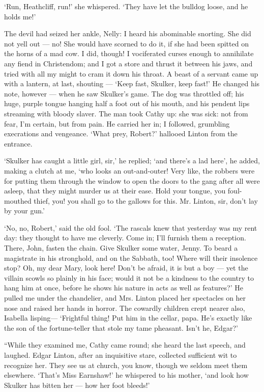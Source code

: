 \par ‘Run, Heathcliff, run!’ she whispered. ‘They have let the bulldog loose, and he holds me!’
\par The devil had seized her ankle, Nelly: I heard his abominable snorting. She did not yell out — no! She would have scorned to do it, if she had been spitted on the horns of a mad cow. I did, though! I vociferated curses enough to annihilate any fiend in Christendom; and I got a store and thrust it between his jaws, and tried with all my might to cram it down his throat. A beast of a servant came up with a lantern, at last, shouting — ‘Keep fast, Skulker, keep fast!’ He changed his note, however — when he saw Skulker's game. The dog was throttled off; his huge, purple tongue hanging half a foot out of his mouth, and his pendent lips streaming with bloody slaver. The man took Cathy up: she was sick: not from fear, I'm certain, but from pain. He carried her in; I followed, grumbling execrations and vengeance. ‘What prey, Robert?’ hallooed Linton from the entrance.
\par ‘Skulker has caught a little girl, sir,’ he replied; ‘and there's a lad here', he added, making a clutch at me, ‘who looks an out-and-outer! Very like, the robbers were for putting them through the window to open the doors to the gang after all were asleep, that they might murder us at their ease. Hold your tongue, you foul-mouthed thief, you! you shall go to the gallows for this. Mr. Linton, sir, don't lay by your gun.’
\par ‘No, no, Robert,’ said the old fool. ‘The rascals knew that yesterday was my rent day: they thought to have me cleverly. Come in; I'll furnish them a reception. There, John, fasten the chain. Give Skulker some water, Jenny. To beard a magistrate in his stronghold, and on the Sabbath, too! Where will their insolence stop? Oh, my dear Mary, look here! Don't be afraid, it is but a boy — yet the villain scowls so plainly in his face; would it not be a kindness to the country to hang him at once, before he shows his nature in acts as well as features?’ He pulled me under the chandelier, and Mrs. Linton placed her spectacles on her nose and raised her hands in horror. The cowardly children crept nearer also, Isabella lisping— ‘Frightful thing! Put him in the cellar, papa. He's exactly like the son of the fortune-teller that stole my tame pheasant. Isn't he, Edgar?’
\par “While they examined me, Cathy came round; she heard the last speech, and laughed. Edgar Linton, after an inquisitive stare, collected sufficient wit to recognize her. They see us at church, you know, though we seldom meet them elsewhere. ‘That's Miss Earnshaw!’ he whispered to his mother, ‘and look how Skulker has bitten her — how her foot bleeds!’
